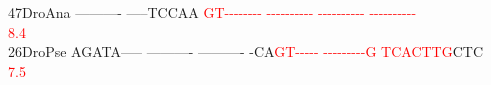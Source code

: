 \documentclass[11pt,twoside,reqno,a4paper]{article}
\begin{document}
{47\hspace*{2\charwidth}DroAna	----------	-----TCCAA	\textcolor{red}{G}\textcolor{red}{T}\textcolor{red}{-}\textcolor{red}{-}\textcolor{red}{-}\textcolor{red}{-}\textcolor{red}{-}\textcolor{red}{-}\textcolor{red}{-}\textcolor{red}{-}	\textcolor{red}{-}\textcolor{red}{-}\textcolor{red}{-}\textcolor{red}{-}\textcolor{red}{-}\textcolor{red}{-}\textcolor{red}{-}\textcolor{red}{-}\textcolor{red}{-}\textcolor{red}{-}	\textcolor{red}{-}\textcolor{red}{-}\textcolor{red}{-}\textcolor{red}{-}\textcolor{red}{-}\textcolor{red}{-}\textcolor{red}{-}\textcolor{red}{-}\textcolor{red}{-}\textcolor{red}{-}	\textcolor{red}{-}\textcolor{red}{-}\textcolor{red}{-}\textcolor{red}{-}\textcolor{red}{-}\textcolor{red}{-}\textcolor{red}{-}\textcolor{red}{-}\textcolor{red}{-}\textcolor{red}{-}	\\
\hspace*{4\charwidth}\hspace*{7\charwidth}\hspace*{1\charwidth}\hspace*{1\charwidth}\hspace*{20\charwidth}\textcolor{red}{8.4}\hspace*{1\charwidth}\hspace*{1\charwidth}\hspace*{1\charwidth}\hspace*{1\charwidth}\\
26\hspace*{2\charwidth}DroPse	AGATA-----	----------	----------	-CA\textcolor{red}{G}\textcolor{red}{T}\textcolor{red}{-}\textcolor{red}{-}\textcolor{red}{-}\textcolor{red}{-}\textcolor{red}{-}	\textcolor{red}{-}\textcolor{red}{-}\textcolor{red}{-}\textcolor{red}{-}\textcolor{red}{-}\textcolor{red}{-}\textcolor{red}{-}\textcolor{red}{-}\textcolor{red}{-}\textcolor{red}{G}	\textcolor{red}{T}\textcolor{red}{C}\textcolor{red}{A}\textcolor{red}{C}\textcolor{red}{T}\textcolor{red}{T}\textcolor{red}{G}CTC	\\
\hspace*{4\charwidth}\hspace*{7\charwidth}\hspace*{1\charwidth}\hspace*{1\charwidth}\hspace*{1\charwidth}\hspace*{33\charwidth}\textcolor{red}{7.5}\hspace*{1\charwidth}\hspace*{1\charwidth}\hspace*{1\charwidth}\\
}
\end{document}
